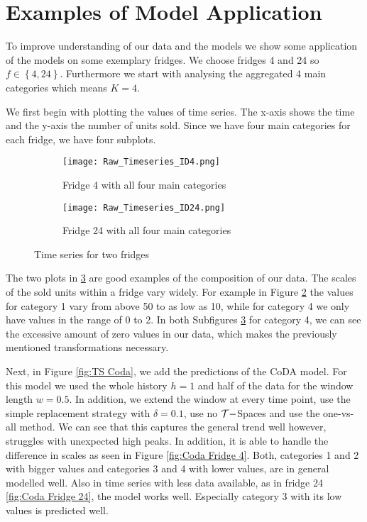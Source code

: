 \section{Examples of Model Application}
\label{sec:Examples of model application}

To improve understanding of our data and the models we show some application of the models on some exemplary fridges. We choose fridges 4 and 24 so $f \in \left\{4,24\right\}$. Furthermore we start with analysing the aggregated 4 main categories which means $K=4$. 

We first begin with plotting the values of time series. The x-axis shows the time and the y-axis the number of units sold. Since we have four main categories for each fridge, we have four subplots. 

\begin{figure}[htb]
\centering
\begin{subfigure}[b]{0.45\textwidth}
\texttt{[image: Raw\_Timeseries\_ID4.png]} 
\caption{Fridge 4 with all four main categories}
\label{fig:TS Fridge 4}
\end{subfigure}
\hfill
\begin{subfigure}[b]{0.45\textwidth}
\texttt{[image: Raw\_Timeseries\_ID24.png]} 
\caption{Fridge 24 with all four main categories}
\label{fig:TS Fridge 24}
\end{subfigure}
\caption{Time series for two fridges}
\label{fig:TS raw}
\end{figure}


The two plots in \ref{fig:TS raw} are good examples of the composition of our data. The scales of the sold units within a fridge vary widely. For example in Figure \ref{fig:TS Fridge 24} the values for category 1 vary from above 50 to as low as 10, while for category 4 we only have values in the range of 0 to 2. In both Subfigures \ref{fig:TS raw} for category 4, we can see the excessive amount of zero values in our data, which makes the previously mentioned transformations necessary. 

Next, in Figure \ref{fig:TS Coda}, we add the predictions of the CoDA model. For this model we used the whole history $h=1$ and half of the data for the window length $w=0.5$. In addition, we extend the window at every time point, use the simple replacement strategy with $\delta=0.1$, use no $\mathcal{T}-$Spaces and use the one-vs-all method. We can see that this captures the general trend well however, struggles with unexpected high peaks. In addition, it is able to handle the difference in scales as seen in Figure \ref{fig:Coda Fridge 4}. Both, categories 1 and 2 with bigger values and categories 3 and 4 with lower values, are in general modelled well. Also in time series with less data available, as in fridge 24 \ref{fig:Coda Fridge 24}, the model works well. Especially category 3 with its low values is predicted well. 

